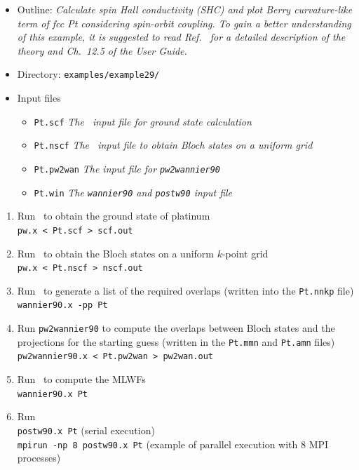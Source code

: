 \documentclass[a4paper,11pt,twoside]{article}
\begin{document}

\begin{itemize}
	\item{Outline: {\it Calculate spin Hall conductivity (SHC) and 
		plot Berry curvature-like term  
		of fcc Pt considering spin-orbit coupling. 
		To gain a better understanding of this example, 
		it is suggested to read Ref.~\cite{qiao-prb2018} for a detailed 
		description of the theory and Ch.~12.5 of the User Guide.}}
	\item{Directory: {\tt examples/example29/}}
	\item{Input files}
	\begin{itemize}
		\item{ {\tt Pt.scf} {\it The \pwscf\ input file for ground state
				calculation}}
		\item{ {\tt Pt.nscf}  {\it The \pwscf\ input file to obtain Bloch
				states on a uniform grid}} 
		\item{ {\tt Pt.pw2wan}  {\it The input file for {\tt pw2wannier90}}}
		\item{ {\tt Pt.win}  {\it The {\tt wannier90} and {\tt postw90} input file}}
	\end{itemize}
\end{itemize}

\begin{enumerate}
	\item Run \pwscf\ to obtain the ground state of platinum\\
	{\tt pw.x < Pt.scf > scf.out}
	
	\item Run \pwscf\ to obtain the Bloch states on a uniform $k$-point
	grid\\ 
	{\tt pw.x < Pt.nscf > nscf.out}
	
	\item Run \wannier\ to generate a list of the required overlaps (written
	into the {\tt Pt.nnkp} file)\\
	{\tt wannier90.x -pp Pt}
	
	\item Run {\tt pw2wannier90} to compute the overlaps between Bloch
	states and the projections for the starting guess (written in the
	{\tt Pt.mmn} and {\tt  Pt.amn} files)\\
	{\tt pw2wannier90.x < Pt.pw2wan > pw2wan.out}
	
	\item Run \wannier\ to compute the MLWFs\\
	{\tt wannier90.x Pt}
	
	\item Run \postw\ \\
	{\tt postw90.x Pt} (serial execution)\\
	{\tt mpirun -np 8 postw90.x Pt} (example of parallel execution with
	8 MPI processes) 
	
\end{enumerate}
\end{document}
